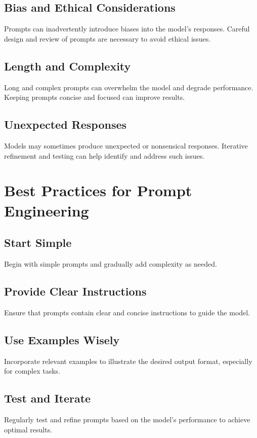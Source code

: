 \subsection{Bias and Ethical Considerations}
Prompts can inadvertently introduce biases into the model's responses. Careful design and review of prompts are necessary to avoid ethical issues.

\subsection{Length and Complexity}
Long and complex prompts can overwhelm the model and degrade performance. Keeping prompts concise and focused can improve results.

\subsection{Unexpected Responses}
Models may sometimes produce unexpected or nonsensical responses. Iterative refinement and testing can help identify and address such issues.

\section{Best Practices for Prompt Engineering}

\subsection{Start Simple}
Begin with simple prompts and gradually add complexity as needed.

\subsection{Provide Clear Instructions}
Ensure that prompts contain clear and concise instructions to guide the model.

\subsection{Use Examples Wisely}
Incorporate relevant examples to illustrate the desired output format, especially for complex tasks.

\subsection{Test and Iterate}
Regularly test and refine prompts based on the model's performance to achieve optimal results.

